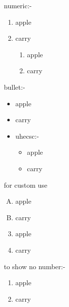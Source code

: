 \documentclass[12pt]{article}
\begin{document}
numeric:-
\begin{enumerate}
\item apple
\item carry
\begin{enumerate}

\item apple
\item carry
\end{enumerate}
\end{enumerate}

bullet:-
\begin{itemize}
\item apple
\item carry
\item uhecsc:-
\begin{itemize}
\item apple
\item carry
\end{itemize}
\end{itemize}



for custom use
\begin{enumerate}[A.]

\item apple
\item carry
\end{enumerate}


\begin{enumerate}\setcounter{enumi}{2}

\item apple
\item carry
\end{enumerate}


to show no number:-
\begin{enumerate}
\item[] apple
\item[] carry
\end{enumerate}
\end{document}
